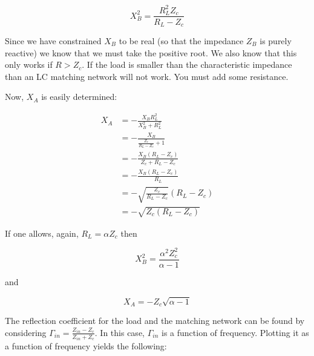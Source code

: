 \[ 
    X_B^2 = \frac{R_L^2 Z_c}{R_L-Z_c}
\]

Since we have constrained $X_B$ to be real (so that the impedance $Z_B$ is purely
reactive) we know that we must take the positive root. We also know that this
only works if $R > Z_c$. If the load is smaller than the characteristic
impedance than an LC matching network will not work. You must add some
resistance.

Now, $X_A$ is easily determined:

\begin{align*}
    X_A &= -\frac{X_B R_L^2}{X_B^2 + R_L^2} \\
        &= - \frac{X_B}{\frac{Z_c}{R_L - Z_c} + 1} \\
        &= -\frac{X_B \left( R_L - Z_c \right)}{Z_c + R_L - Z_c} \\
        &= -\frac{X_B \left( R_L - Z_c \right)}{R_L} \\
        &= -\sqrt{\frac{Z_c}{R_L - Z_c}} \left( R_L - Z_c \right) \\
        &= -\sqrt{Z_c \left( R_L-Z_c \right)}
\end{align*}

If one allows, again, $R_L = \alpha Z_c$ then

\[ 
    X_B^2 = \frac{\alpha^2 Z_c^2}{\alpha - 1} 
\]

and 

\[ 
        X_A = -Z_c\sqrt{\alpha - 1}
\]


The reflection coefficient for the load and the matching network can be found by
considering $ \Gamma_{in} = \frac{Z_{in} - Z_c}{Z_{in} + Z_c} $. In this case,
$\Gamma_{in}$ is a function of frequency. Plotting it as a function of frequency
yields the following:

